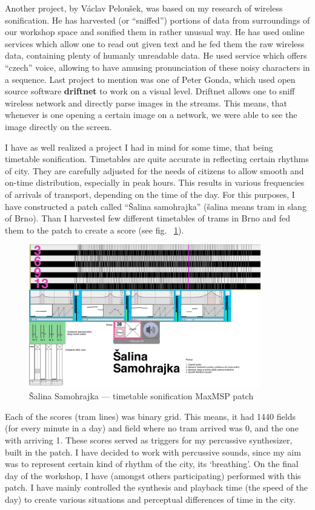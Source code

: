 \documentclass[12pt,a4paper,oneside]{report}
\begin{document}
Another project, by Václav Peloušek, was based on my research of wireless sonification. He has harvested (or ``sniffed'') portions of data from surroundings of our workshop space and sonified them in rather unusual way. He has used online services which allow one to read out given text and he fed them the raw wireless data, containing plenty of humanly unreadable data. He used service which offers ``czech'' voice, allowing to have amusing pronunciation of these noisy characters in a sequence. Last project to mention was one of Peter Gonda, which used open source software \textbf{driftnet} to work on a visual level. Driftnet allows one to sniff wireless network and directly parse images in the streams. This means, that whenever is one opening a certain image on a network, we were able to see the image directly on the screen.

I have as well realized a project I had in mind for some time, that being timetable sonification. Timetables are quite accurate in reflecting certain rhythms of city. They are carefully adjusted for the needs of citizens to allow smooth and on-time distribution, especially in peak hours. This results in various frequencies of arrivals of transport, depending on the time of the day. For this purposes, I have constructed a patch called ``Šalina samohrajka'' (šalina means tram in slang of Brno). Than I harvested few different timetables of trams in Brno and fed them to the patch to create a score (see fig. ~\ref{fig:salina}).

\begin{figure}  
  \centering
    \includegraphics[width=0.9\textwidth]{img/salina}
	\caption{Šalina Samohrajka --- timetable sonification MaxMSP patch}
	\label{fig:salina}
\end{figure}

Each of the scores (tram lines) was binary grid. This means, it had 1440 fields (for every minute in a day) and field where no tram arrived was 0, and the one with arriving 1. These scores served as triggers for my percussive synthesizer, built in the patch. I have decided to work with percussive sounds, since my aim was to represent certain kind of rhythm of the city, its `breathing'. On the final day of the workshop, I have (amongst others participating) performed with this patch. I have mainly controlled the synthesis and playback time (the speed of the day) to create various situations and perceptual differences of time in the city. 
\end{document}
